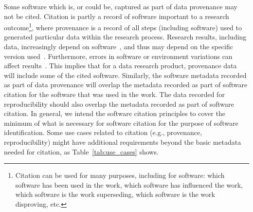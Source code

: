 \documentclass[12pt, oneside]{amsart}
\newcommand{\dmnote}[1]{ {\textcolor{purple} { ***DM: #1 }}} %
\newcommand{\ssnote}[1]{ {\textcolor{bondiblue} { ***SS: #1}}} %
\begin{document}

Some software which is, or could be, captured as part of data provenance may not be cited.
Citation is partly a record of software important to a research outcome\footnote{Citation
can be used for many purposes, including for software: which software has been used in
the work, which software has influenced the work, which software is the work superseding,
which software is the work disproving, etc.}, where provenance is a record of all steps
(including software) used to generated particular data within the research process.
Research results, including data, increasingly depend on software~\cite{Hannay:2009wp},
and thus may depend on the specific version
used~\cite{Sandve:2013gh,Wilson:2014aa}. Furthermore, errors in software or
environment variations can affect results~\cite{Morin:2012hz,Soergel:2015aa}.
This implies that for a data research product, provenance data will include some of
the cited software.
Similarly, the software metadata recorded as part of data provenance will
overlap the metadata recorded as part of software citation for the software that
was used in the work. The data recorded for reproducibility should also overlap
the metadata recorded as part of software citation.
In general, we intend the software citation principles to cover the minimum of what is
necessary for software citation for the purpose of software identification.
Some use cases related to citation (e.g., provenance, reproducibility) might have additional requirements beyond the basic metadata needed for citation, as Table~\ref{tab:use_cases} shows.
\end{document}
